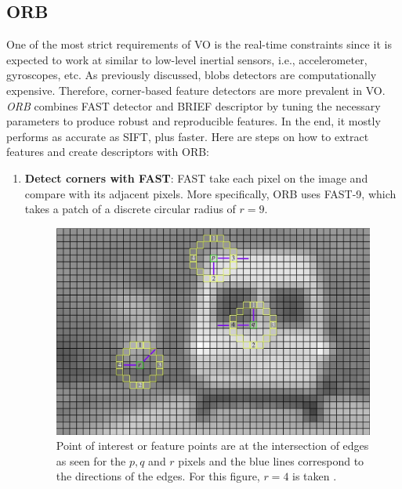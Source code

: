 \documentclass[a4paper]{report}
\numberwithin{figure}{section}
\begin{document}
\begin{appendices}

\chapter{} \label{cp_appendices}

\section{ORB} \label{sb_sc_orb}

One of the most strict requirements of VO is the real-time constraints since 
it is expected to work at similar to low-level inertial sensors, i.e., 
accelerometer, gyroscopes, etc.  As previously discussed, blobs detectors are 
computationally expensive. Therefore, corner-based feature detectors are more 
prevalent in VO.  \textit{ORB} \parencite{Rublee2011a} combines FAST detector 
\parencite{Rosten2006} and BRIEF descriptor \parencite{M.2010} by tuning the 
necessary 
parameters to produce robust and reproducible features.  In the end, it mostly 
performs as accurate as SIFT, plus faster. Here are steps on how to extract 
features and create descriptors with ORB: 

\begin{enumerate}
	\item \textbf{Detect corners with FAST}: FAST take each pixel on 
	the image and compare with its adjacent pixels. More specifically, 
	ORB uses FAST-9, which takes a patch of a discrete circular radius of 
	$r=9$. 
	\begin{figure}[H]
		\centering
		\includegraphics[width=0.7\linewidth,natwidth=640,natheight=640]
		{fig/ref_imgs/fast.png}
		\caption[FAST Corners]
		{Point of interest or feature points are at the intersection of edges 
			as seen for the $p,q$ and $r$ pixels and the blue lines correspond 
			to 
			the directions of the edges. For this figure, $r=4$ is taken 
			\parencite{Klette2014}.}
		\label{fig:fast_corners}
	\end{figure}
	

\end{enumerate}
\end{appendices}
\end{document}
